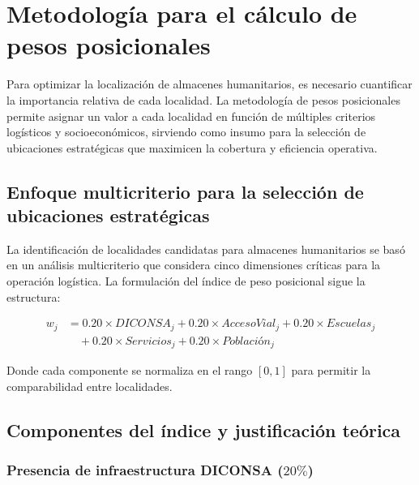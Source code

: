 \documentclass[
  spanish,
  us-letterpaper,
  DIV=11,
  numbers=noendperiod]{scrreprt}
\numberwithin{equation}{section}
\begin{document}
\section{Metodología para el cálculo de pesos
posicionales}\label{metodologuxeda-para-el-cuxe1lculo-de-pesos-posicionales}

Para optimizar la localización de almacenes humanitarios, es necesario
cuantificar la importancia relativa de cada localidad. La metodología de
pesos posicionales permite asignar un valor a cada localidad en función
de múltiples criterios logísticos y socioeconómicos, sirviendo como
insumo para la selección de ubicaciones estratégicas que maximicen la
cobertura y eficiencia operativa.

\subsection{Enfoque multicriterio para la selección de ubicaciones
estratégicas}\label{enfoque-multicriterio-para-la-selecciuxf3n-de-ubicaciones-estratuxe9gicas}

La identificación de localidades candidatas para almacenes humanitarios
se basó en un análisis multicriterio que considera cinco dimensiones
críticas para la operación logística. La formulación del índice de peso
posicional sigue la estructura:

\[
\begin{split}
w_j &= 0.20 \times DICONSA_j + 0.20 \times AccesoVial_j + 0.20 \times Escuelas_j \\
    &\quad + 0.20 \times Servicios_j + 0.20 \times Población_j
\end{split}
\]

Donde cada componente se normaliza en el rango \([0,1]\) para permitir
la comparabilidad entre localidades.

\subsection{Componentes del índice y justificación
teórica}\label{componentes-del-uxedndice-y-justificaciuxf3n-teuxf3rica}

\subsubsection{\texorpdfstring{Presencia de infraestructura DICONSA
(\(20\%\))}{Presencia de infraestructura DICONSA (20\textbackslash\%)}}\label{presencia-de-infraestructura-diconsa-20}
\end{document}

